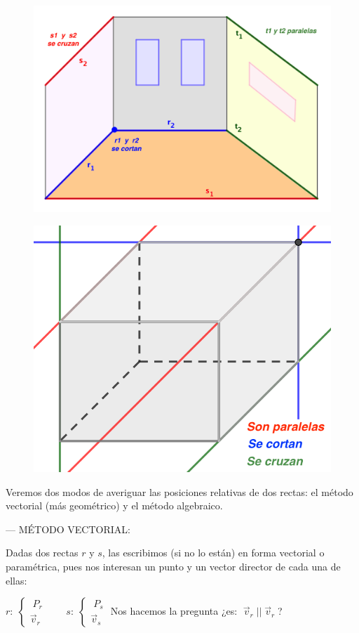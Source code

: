 \begin{multicols}{2}
 	\begin{figure}[H]
		\centering
		\includegraphics[width=.5\textwidth]{imagenes/imagenes10/T10IM08.png}
 	\end{figure}
 
 	\begin{figure}[H]
		\centering
		\includegraphics[width=.45\textwidth]{imagenes/imagenes10/T10IM09.png}
 	\end{figure}
 \end{multicols}
 
 	Veremos dos modos de averiguar las posiciones relativas de dos rectas: el método vectorial (más geométrico) y el método algebraico.
 
 
 --- MÉTODO VECTORIAL:
 
\noindent Dadas dos rectas $r$ y $s$, las escribimos (si no lo están) en forma vectorial o paramétrica, pues nos interesan un punto y un vector director de cada una de ellas:
 
\noindent $r:\; \begin{cases} \; P_r \\ \vec v_r \end{cases} \qquad   
  s:\; \begin{cases} \; P_s \\ \vec v_s \end{cases}$ 
Nos hacemos la pregunta ¿es: $\;\vec v_r \;||\; \vec v_r\;$?
	
